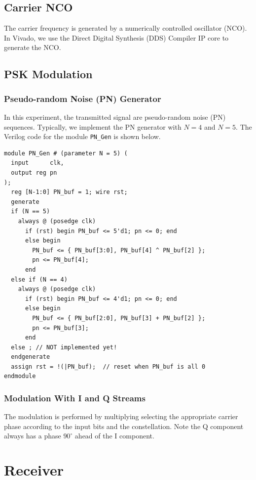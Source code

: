 \documentclass[journal,twoside]{IEEEtran}
\begin{document}
    \subsection{Carrier NCO}

      The carrier frequency is generated by a numerically controlled oscillator (NCO).
      In Vivado, we use the Direct Digital Synthesis (DDS) Compiler IP core to generate the NCO.

  \subsection{PSK Modulation}

    \subsubsection{Pseudo-random Noise (PN) Generator}

      In this experiment, the transmitted signal are pseudo-random noise (PN) sequences.
      Typically, we implement the PN generator with $N=4$ and $N=5$. %
      The Verilog code for the module \texttt{PN\_Gen} is shown below.
      \begin{verbatim}
module PN_Gen # (parameter N = 5) (
  input      clk,
  output reg pn
);
  reg [N-1:0] PN_buf = 1; wire rst;
  generate
  if (N == 5)
    always @ (posedge clk)
      if (rst) begin PN_buf <= 5'd1; pn <= 0; end
      else begin
        PN_buf <= { PN_buf[3:0], PN_buf[4] ^ PN_buf[2] };
        pn <= PN_buf[4];
      end
  else if (N == 4)
    always @ (posedge clk)
      if (rst) begin PN_buf <= 4'd1; pn <= 0; end
      else begin
        PN_buf <= { PN_buf[2:0], PN_buf[3] + PN_buf[2] };
        pn <= PN_buf[3];
      end
  else ; // NOT implemented yet!
  endgenerate
  assign rst = !(|PN_buf);  // reset when PN_buf is all 0
endmodule
      \end{verbatim}

    \subsubsection{Modulation With I and Q Streams}

      The modulation is performed by multiplying selecting the appropriate carrier phase
      according to the input bits and the constellation.
      Note the Q component always has a phase $90^\circ$ ahead of the I component.

  \section{Receiver}
\end{document}
